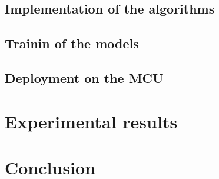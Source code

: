 \documentclass[12pt]{report}
\begin{document}
\section{Implementation of the algorithms}

\section{Trainin of the models}

\section{Deployment on the MCU}









\chapter{Experimental results} 






\chapter{Conclusion}













\end{document}
